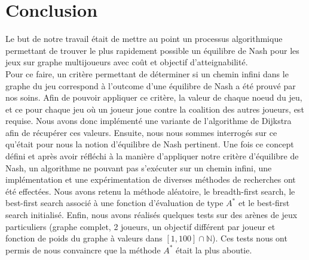 
\section{Conclusion}

Le but de notre travail était de mettre au point un processus algorithmique permettant de trouver le plus rapidement possible un équilibre de Nash pour les jeux sur graphe multijoueurs avec coût et objectif d'atteignabilité. \\

Pour ce faire, un critère permettant de déterminer si un chemin infini dans le graphe du jeu correspond à l'outcome d'une équilibre de Nash a été prouvé par nos soins. Afin de pouvoir appliquer ce critère, la valeur de chaque noeud du jeu, et ce pour chaque jeu où un joueur joue contre la coalition des autres joueurs, est requise. Nous avons donc implémenté une variante de l'algorithme de Dijkstra afin de récupérer ces valeurs. Ensuite, nous nous sommes interrogés sur ce qu'était pour nous la notion d'équilibre de Nash pertinent. Une fois ce concept défini et après avoir réfléchi à la manière d'appliquer notre critère d'équilibre de Nash, un algorithme ne pouvant pas s'exécuter sur un chemin infini, une implémentation et une expérimentation de diverses méthodes de recherches ont été effectées. Nous avons retenu la méthode aléatoire, le breadth-first search, le best-first search associé à une fonction d'évaluation de type $A^*$ et le best-first search initialisé. Enfin, nous avons réalisés quelques tests sur des arènes de jeux particuliers (graphe complet, 2 joueurs, un objectif différent par joueur et fonction de poids du graphe à valeurs dans $[1, 100] \cap \mathbb{N}$). Ces tests nous ont permis de nous convaincre que la méthode $A^*$ était la plus aboutie.\\



